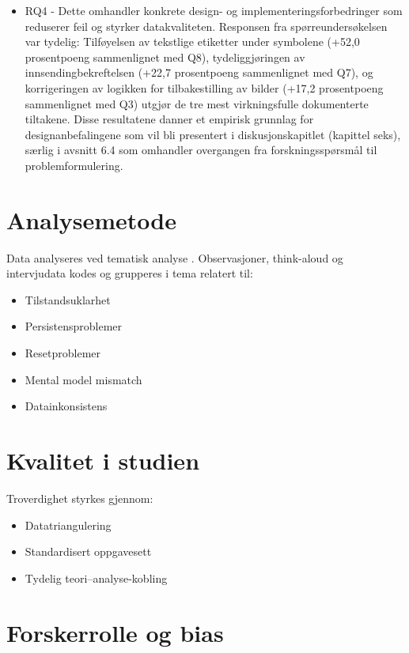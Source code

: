 \begin{itemize}
\item RQ4 - Dette omhandler konkrete design- og implementeringsforbedringer som reduserer feil og styrker datakvaliteten. Responsen fra spørreundersøkelsen var tydelig: Tilføyelsen av tekstlige etiketter under symbolene (+52,0 prosentpoeng sammenlignet med Q8), tydeliggjøringen av innsendingbekreftelsen (+22,7 prosentpoeng sammenlignet med Q7), og korrigeringen av logikken for tilbakestilling av bilder (+17,2 prosentpoeng sammenlignet med Q3) utgjør de tre mest virkningsfulle dokumenterte tiltakene. Disse resultatene danner et empirisk grunnlag for designanbefalingene som vil bli presentert i diskusjonskapitlet (kapittel seks), særlig i avsnitt 6.4 som omhandler overgangen fra forskningsspørsmål til problemformulering.
\end{itemize}




\section{Analysemetode}

Data analyseres ved tematisk analyse \cite{braun2006}. Observasjoner, think-aloud og intervjudata kodes og grupperes i tema relatert til:

\begin{itemize}
\item Tilstandsuklarhet
\item Persistensproblemer
\item Resetproblemer
\item Mental model mismatch
\item Datainkonsistens
\end{itemize}

\section{Kvalitet i studien}

Troverdighet styrkes gjennom:

\begin{itemize}
\item Datatriangulering
\item Standardisert oppgavesett
\item Tydelig teori–analyse-kobling
\end{itemize}

\section{Forskerrolle og bias}

